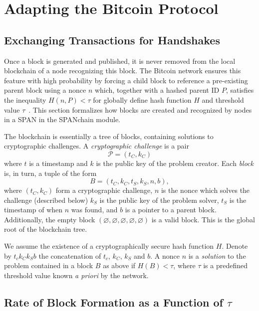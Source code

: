 \section{Adapting the Bitcoin Protocol}
\label{sec:blockchain}

\subsection{Exchanging Transactions for Handshakes}

Once a block is generated and published,
it is never removed from the local blockchain of a node recognizing
this block. The Bitcoin network ensures this feature with high
probability by forcing a child block to reference a pre-existing parent
block using a nonce $n$ which, together with a hashed parent ID $P$, satisfies
the inequality $H(n,P)<\tau$ for globally define hash function $H$ and
threshold value $\tau$~\cite{nakamoto2008bitcoin}.
This section formalizes how blocks are created and recognized by nodes in a SPAN
in the SPANchain module.

The blockchain is essentially a tree of blocks,
containing solutions to cryptographic challenges.
A \emph{cryptographic challenge} is a pair
\begin{equation*}
	\mathcal P = (t_C, k_C)
\end{equation*}
where $t$ is a timestamp and $k$ is the public key of the problem creator.
Each \emph{block} is, in turn, a tuple of the form
\begin{equation*}
	B = (t_C, k_C, t_S, k_S, n, b),
\end{equation*}
where $(t_C, k_C)$ form a cryptographic challenge,
$n$ is the nonce which solves the challenge (described below)
$k_S$ is the public key of the problem solver,
$t_S$ is the timestamp of when $n$ was found,
and $b$ is a pointer to a parent block.
Additionally,
the empty block $(\varnothing, \varnothing, \varnothing, \varnothing, \varnothing)$
is a valid block.
This is the global root of the blockchain tree.

We assume the existence of a cryptographically secure hash function $H$.
Denote by $t_c k_C k_S b$ the concatenation of $t_c$, $k_C$, $k_S$ and $b$.
A nonce $n$ is a \emph{solution} to the problem contained in a block $B$ as above
if $H(B) < \tau$,
where $\tau$ is a predefined threshold value known \emph{a priori} by the network.

\subsection{Rate of Block Formation as a Function of $\tau$}

